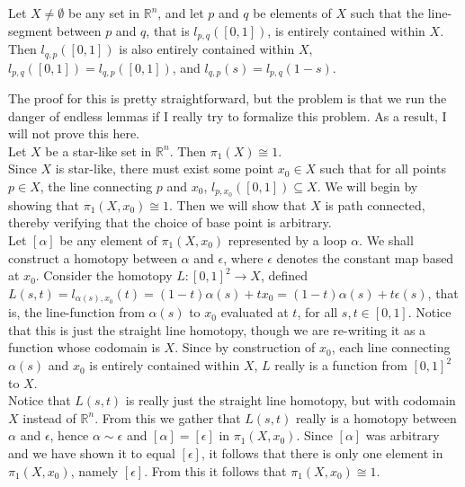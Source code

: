 \documentclass{article}
\newcommand{\R}{\mathbb{R}}
\newcommand{\R}{\mathbb{R}}
\begin{document}
 Let $X\ne \emptyset$ be any set in $\R^n$, and let $p$ and $q$ be elements of $X$ such that the line-segment between $p$ and $q$, that is $l_{p,q}([0,1])$, is entirely contained within $X$. Then $l_{q,p}([0,1])$ is also entirely contained within $X$, $l_{p,q}([0,1]) = l_{q,p}([0,1])$, and $l_{q,p}(s) = l_{p,q}(1-s)$.

 The proof for this is pretty straightforward, but the problem is that we run the danger of endless lemmas if I really try to formalize this problem. As a result, I will not prove this here.\\



 Let $X$ be a star-like set in $\R^n$. Then $\pi_1(X) \cong 1$.\\

 Since $X$ is star-like, there must exist some point $x_0\in X$ such that for all points $p\in X$, the line connecting $p$ and $x_0$, $l_{p,x_0}([0,1])\subseteq X$. We will begin by showing that $\pi_1(X,x_0)\cong 1$. Then we will show that $X$ is path connected, thereby verifying that the choice of base point is arbitrary.\\

Let $[\alpha]$ be any element of $\pi_1(X,x_0)$ represented by a loop $\alpha$. We shall construct a homotopy between $\alpha$ and $\epsilon$, where $\epsilon$ denotes the constant map based at $x_0$. Consider the homotopy $L:[0,1]^2\rightarrow X$, defined $L(s,t) = l_{\alpha(s),x_0}(t) = (1-t)\alpha(s) + tx_0 = (1-t)\alpha(s) + t\epsilon(s)$, that is, the line-function from $\alpha(s)$ to $x_0$ evaluated at $t$, for all $s,t\in [0,1]$. Notice that this is just the straight line homotopy, though we are re-writing it as a function whose codomain is $X$. Since by construction of $x_0$, each line connecting $\alpha(s)$ and $x_0$ is entirely contained within $X$, $L$ really is a function from $[0,1]^2$ to $X$. \\

Notice that $L(s,t)$ is really just the straight line homotopy, but with codomain $X$ instead of $\R^n$. From this we gather that $L(s,t)$ really is a homotopy between $\alpha$ and $\epsilon$, hence $\alpha\sim \epsilon$ and $[\alpha] = [\epsilon]$ in $\pi_1(X,x_0)$. Since $[\alpha]$ was arbitrary and we have shown it to equal $[\epsilon]$, it follows that there is only one element in $\pi_1(X,x_0)$, namely $[\epsilon]$. From this it follows that $\pi_1(X,x_0)\cong 1$.\\
\end{document}

